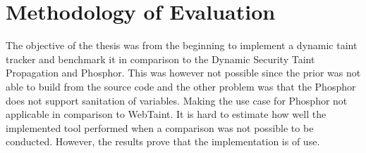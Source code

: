 \section{Methodology of Evaluation}
\label{methev}
The objective of the thesis was from the beginning to implement a dynamic taint tracker and benchmark it in comparison to the Dynamic Security Taint Propagation and Phosphor. This was however not possible since the prior was not able to build from the source code and the other problem was that the Phosphor does not support sanitation of variables. Making the use case for Phosphor not applicable in comparison to WebTaint. It is hard to estimate how well the implemented tool performed when a comparison was not possible to be conducted. However, the results prove that the implementation is of use.